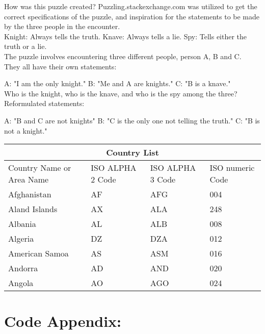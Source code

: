 \documentclass[11pt]{amsart}
\begin{document}
How was this puzzle created?
	Puzzling.stackexchange.com was utilized to get the correct specifications of the puzzle,
	and inspiration for the statements to be made by the three people in the encounter. \\

Knight: Always tells the truth.
Knave: 	Always tells a lie.
Spy: 		Tells either the truth or a lie. \\

The puzzle involves encountering three different people, person A, B and C. \\

They all have their own statements:

	A: "I am the only knight."
	B: "Me and A are knights."
	C: "B is a knave." \\

Who is the knight, who is the knave, and who is the spy among the three? \\


Reformulated statements:

	A: "B and C are not knights"
	B: "C is the only one not telling the truth."
	C: "B is not a knight." \\



	\begin{tabular}{ |p{3cm}||p{3cm}|p{3cm}|p{3cm}|  }
	 \hline
	 \multicolumn{4}{|c|}{Country List} \\
	 \hline
	 Country Name     or Area Name& ISO ALPHA 2 Code &ISO ALPHA 3 Code&ISO numeric Code\\
	 \hline
	 Afghanistan   & AF    &AFG&   004\\
	 Aland Islands&   AX  & ALA   &248\\
	 Albania &AL & ALB&  008\\
	 Algeria    &DZ & DZA&  012\\
	 American Samoa&   AS  & ASM&016\\
	 Andorra& AD  & AND   &020\\
	 Angola& AO  & AGO&024\\
	 \hline
	\end{tabular}


\section{Code Appendix:}

\begin{verbatim}



\end{verbatim}
\end{document}
